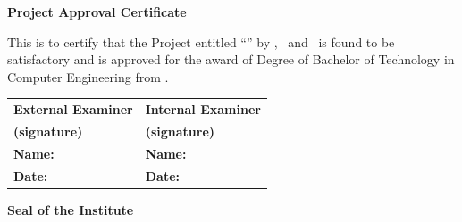 \thispagestyle{empty}
\vspace*{0.2cm}
\begin{center}
{\Large\bfseries Project Approval Certificate}
\end{center}

\vspace{2cm}

\noindent This is to certify that the Project entitled ``\projecttitle'' by \candone, \candtwo\ and \candthree\ is found to be satisfactory and is approved for the award of Degree of Bachelor of Technology in Computer Engineering from \university.

\vspace{4cm}

\noindent
\renewcommand{\arraystretch}{2.2}
\begin{tabular*}{\textwidth}{@{\extracolsep{\fill}}ll}
\textbf{External Examiner} & \textbf{Internal Examiner} \\[1.5cm]
\textbf{(signature)} & \textbf{(signature)} \\
\textbf{Name:} & \textbf{Name:} \\[1cm]
\textbf{Date:} & \textbf{Date:} \\
\end{tabular*}

\vspace{2cm}
\begin{center}
\textbf{Seal of the Institute}
\end{center}

